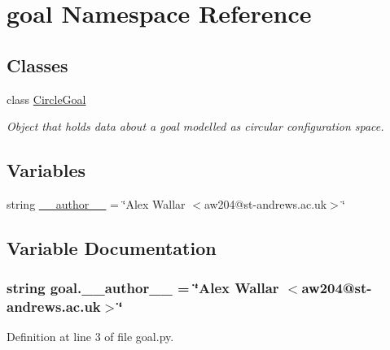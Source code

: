 \hypertarget{namespacegoal}{\section{goal Namespace Reference}
\label{namespacegoal}
}
\subsection*{Classes}
\begin{DoxyCompactItemize}
\item 
class \hyperlink{classgoal_1_1CircleGoal}{Circle\-Goal}
\begin{DoxyCompactList}\small\item\em Object that holds data about a goal modelled as circular configuration space. \end{DoxyCompactList}\end{DoxyCompactItemize}
\subsection*{Variables}
\begin{DoxyCompactItemize}
\item 
string \hyperlink{namespacegoal_ae04fc72068c7219ebcba5f692ad7457c}{\-\_\-\-\_\-author\-\_\-\-\_\-} = \char`\"{}Alex Wallar $<$aw204@st-\/andrews.\-ac.\-uk$>$\char`\"{}
\end{DoxyCompactItemize}


\subsection{Variable Documentation}
\hypertarget{namespacegoal_ae04fc72068c7219ebcba5f692ad7457c}{
\subsubsection[{\-\_\-\-\_\-author\-\_\-\-\_\-}]{\setlength{\rightskip}{0pt plus 5cm}string goal.\-\_\-\-\_\-author\-\_\-\-\_\- = \char`\"{}Alex Wallar $<$aw204@st-\/andrews.\-ac.\-uk$>$\char`\"{}}}\label{namespacegoal_ae04fc72068c7219ebcba5f692ad7457c}


Definition at line 3 of file goal.\-py.

